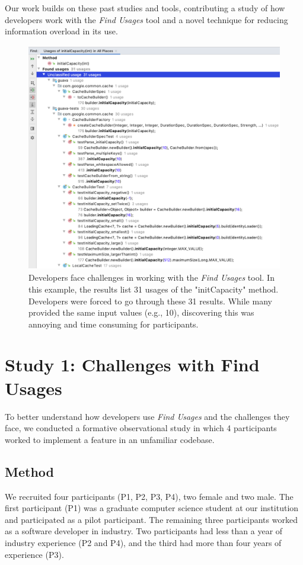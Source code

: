 \documentclass[conference]{IEEEtran}
\begin{document}
Our work builds on these past studies and tools, contributing a study of how developers work with the \textit{Find Usages} tool and a novel technique for reducing information overload in its use.



\begin{figure}[h]
    \centering
    \includegraphics [width=15cm,height=10cm,keepaspectratio,clip]{figures/challenge}
    \caption{Developers face challenges in working with the \textit{Find Usages} tool. In this example, the results list 31 usages of the "initCapacity" method. Developers were forced to go through these 31 results. 
    While many provided the same input values (e.g., 10), discovering this was annoying and time consuming for participants. 
}
\label{fig:usege}
\end{figure}
\section{Study 1: Challenges with Find Usages}

To better understand how developers use \textit{Find Usages} and the challenges they face, we conducted a formative observational study in which 4 participants worked to implement a feature in an unfamiliar codebase.

\subsection{Method}
We recruited four participants (P1, P2, P3, P4), two female and two male. The first participant (P1) was a graduate computer science student at our institution and participated as a pilot participant. The remaining three participants worked as a software developer in industry. Two participants had less than a year of industry experience (P2 and P4), and the third had more than four years of experience (P3).\par 
\end{document}

